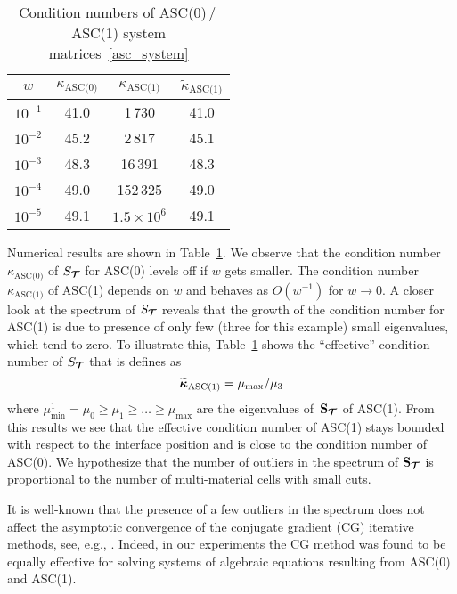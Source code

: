 	\begin{table}[h]
		\centering
		\caption{Condition numbers of ASC(0)\,/\,ASC(1) system matrices~\eqref{asc_system} \label{fig:w:res}}
			\begin{tabular}[1.2]{ | c | c | c | c |}
				\hline
				$w$ & $\kappa_{\text{ASC(0)}}$ & $\kappa_{\text{ASC(1)}}$ & $\widetilde\kappa_{\text{ASC(1)}}$\\
				\hline
				$10^{-1}$ & 41.0 & 1\,730       & 41.0  \\
				\hline
				$10^{-2}$ & 45.2 & 2\,817       & 45.1  \\
				\hline
				$10^{-3}$ & 48.3 & 16\,391      & 48.3   \\
				\hline
				$10^{-4}$ & 49.0 & 152\,325     & 49.0    \\
				\hline
				$10^{-5}$ & 49.1 & $1.5\times10^6$&49.1  \\
				\hline
			\end{tabular}
	\end{table}

	Numerical results are shown in Table~\ref{fig:w:res}. We observe that the condition number~$\kappa_{\text{ASC(0)}}$ of $S_{\boldsymbol{\mathbf{\mathcal T}}}$ for ASC(0) levels off if $w$ gets smaller. The condition number~$\kappa_{\text{ASC(1)}}$ of ASC(1) depends on $w$ and behaves as $O(w^{-1})$ for $w\to0$. A closer look at the spectrum of      $S_{\boldsymbol{\mathbf{\mathcal T}}}$  reveals that the growth of the condition
number for    ASC(1) is due to presence of only few (three for this example) small eigenvalues, which tend to zero. To illustrate this, Table~\ref{fig:w:res} shows the ``effective'' condition number of $S_{\boldsymbol{\mathbf{\mathcal T}}}$ that is defines
as
	$$
		\widetilde{\boldsymbol{\mathbf{\kappa}}}_{\text{ASC(1)}} = {\mu_{\text{max}}}/{\mu_3}
	$$
	where  $\mu_{\text{min}}^1 = \mu_0 \ge \mu_1 \ge \dots \ge \mu_{\text{max}}$ are the eigenvalues of~$\boldsymbol{\mathbf{S}}_{\boldsymbol{\mathbf{\mathcal T}}}$ of ASC(1). From this results we see that the effective condition number of ASC(1) stays bounded with respect to the interface position and is  close to the condition number of ASC(0). We hypothesize that the number of outliers in the  spectrum of $\boldsymbol{\mathbf{S}}_{\boldsymbol{\mathbf{\mathcal T}}}$ is proportional to the number of multi-material cells with small cuts.

	
	It is well-known that the presence of a few outliers in the spectrum does not affect the asymptotic convergence of the conjugate gradient (CG) iterative methods, see, e.g., \cite{olshanskii2014iterative}. Indeed, in our experiments the CG method was found to be equally effective for solving systems of algebraic equations resulting from ASC(0) and ASC(1).
	
